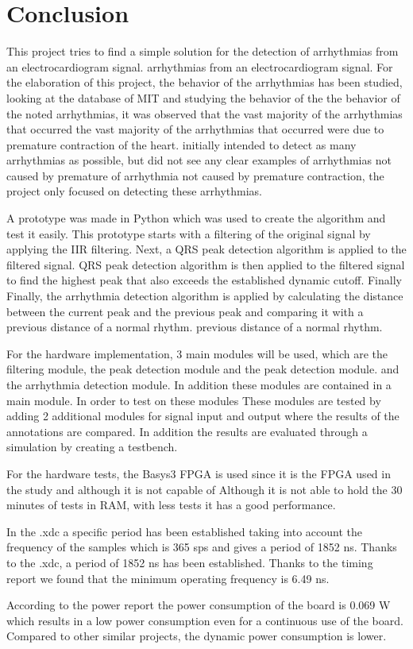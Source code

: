 \section{Conclusion}

This project tries to find a simple solution for the detection of arrhythmias from an electrocardiogram signal. 
arrhythmias from an electrocardiogram signal. For the elaboration of this project, 
the behavior of the arrhythmias has been studied, looking at the database of MIT and studying the behavior of the
the behavior of the noted arrhythmias, it was observed that the vast majority of the arrhythmias that occurred 
the vast majority of the arrhythmias that occurred were due to premature contraction of the heart.
initially intended to detect as many arrhythmias as possible, but did not see any clear examples of arrhythmias not caused by premature
of arrhythmia not caused by premature contraction, the project only focused on detecting these arrhythmias.

A prototype was made in Python which was used to create the algorithm and test it easily. This prototype starts
with a filtering of the original signal by applying the IIR filtering. Next, a QRS peak detection algorithm is applied to the filtered signal. 
QRS peak detection algorithm is then applied to the filtered signal to find the highest peak that also exceeds the established dynamic cutoff. Finally
Finally, the arrhythmia detection algorithm is applied by calculating the distance between the current peak and the previous peak and comparing it with a previous distance of a normal rhythm.
previous distance of a normal rhythm.

For the hardware implementation, 3 main modules will be used, which are the filtering module, the peak detection module and the peak detection module. 
and the arrhythmia detection module. In addition these modules are contained in a main module. In order to test on these modules
These modules are tested by adding 2 additional modules for signal input and output where the results of the annotations are compared. In addition 
the results are evaluated through a simulation by creating a testbench.

For the hardware tests, the Basys3 FPGA is used since it is the FPGA used in the study and although it is not capable of 
Although it is not able to hold the 30 minutes of tests in RAM, with less tests it has a good performance.

In the .xdc a specific period has been established taking into account the frequency of the samples which is 365 sps and gives a period of 1852 ns. Thanks to the .xdc, a period of 1852 ns has been established. 
Thanks to the timing report we found that the minimum operating frequency is 6.49 ns.

According to the power report the power consumption of the board is 0.069 W which results in a low power consumption even for a continuous use of the board.
Compared to other similar projects, the dynamic power consumption is lower.
